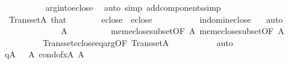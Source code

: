 \begin{isabellebody}
\ \ \ \ \ \ \ \ \isamarkupfalse%
\ \ arg{\isacharunderscore}{\kern0pt}into{\isacharunderscore}{\kern0pt}eclose\ \isamarkupfalse%
\ {\isacharparenleft}{\kern0pt}auto\ simp\ add{\isacharcolon}{\kern0pt}components{\isacharunderscore}{\kern0pt}simp{\isacharparenright}{\kern0pt}\isanewline
\ \ \ \ \ \ \isamarkupfalse%
\ \ {\isacartoucheopen}Transset{\isacharparenleft}{\kern0pt}A{}{\isacharparenright}{\kern0pt}{\isacartoucheclose}\ that{\isacharparenleft}{\kern0pt}{}{\isacharparenright}{\kern0pt}\isanewline
\ \ \ \ \ \ \isamarkupfalse%
\ {\isachardoublequoteopen}{\isasymsigma}{\isasymin}eclose{\isacharparenleft}{\kern0pt}{\isacharquery}{\kern0pt}{\isasymtau}{\isacharparenright}{\kern0pt}\ {\isasymunion}\ eclose{\isacharparenleft}{\kern0pt}{\isacharquery}{\kern0pt}{\isasymtheta}{\isacharparenright}{\kern0pt}{\isachardoublequoteclose}\ \isanewline
\ \ \ \ \ \ \ \ \isamarkupfalse%
\ in{\isacharunderscore}{\kern0pt}dom{\isacharunderscore}{\kern0pt}in{\isacharunderscore}{\kern0pt}eclose\ \ \isamarkupfalse%
\ auto\isanewline
\ \ \ \ \ \ \isamarkupfalse%
\isanewline
\ \ \ \ \ \ \isamarkupfalse%
\ {\isachardoublequoteopen}{\isasymsigma}{\isasymin}A{}{\isachardoublequoteclose}\isanewline
\ \ \ \ \ \ \ \ \isamarkupfalse%
\ mem{\isacharunderscore}{\kern0pt}eclose{\isacharunderscore}{\kern0pt}subset{\isacharbrackleft}{\kern0pt}OF\ {\isacartoucheopen}{\isacharquery}{\kern0pt}{\isasymtau}{\isasymin}A{}{\isacartoucheclose}{\isacharbrackright}{\kern0pt}\ mem{\isacharunderscore}{\kern0pt}eclose{\isacharunderscore}{\kern0pt}subset{\isacharbrackleft}{\kern0pt}OF\ {\isacartoucheopen}{\isacharquery}{\kern0pt}{\isasymtheta}{\isasymin}A{}{\isacartoucheclose}{\isacharbrackright}{\kern0pt}\ \isanewline
\ \ \ \ \ \ \ \ \ \ Transset{\isacharunderscore}{\kern0pt}eclose{\isacharunderscore}{\kern0pt}eq{\isacharunderscore}{\kern0pt}arg{\isacharbrackleft}{\kern0pt}OF\ {\isacartoucheopen}Transset{\isacharparenleft}{\kern0pt}A{}{\isacharparenright}{\kern0pt}{\isacartoucheclose}{\isacharbrackright}{\kern0pt}\ \isanewline
\ \ \ \ \ \ \ \ \isamarkupfalse%
\ auto\ \ \ \ \ \ \ \ \ \isanewline
\ \ \ \ \ \ \isamarkupfalse%
\ {\isacartoucheopen}q{\isasymin}A{}{\isacartoucheclose}\ {\isacartoucheopen}{\isacharquery}{\kern0pt}{\isasymtheta}\ {\isasymin}\ A{}{\isacartoucheclose}\ {\isacartoucheopen}cond{\isacharunderscore}{\kern0pt}of{\isacharparenleft}{\kern0pt}x{\isacharparenright}{\kern0pt}{\isasymin}A{}{\isacartoucheclose}\ {\isacartoucheopen}{\isacharquery}{\kern0pt}{\isasymtau}{\isasymin}A{}{\isacartoucheclose}\isanewline

\end{isabellebody}
